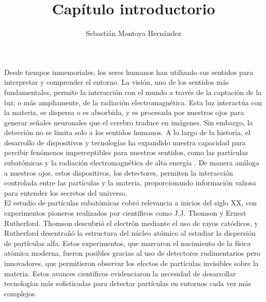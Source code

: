 \documentclass{article}
\title{\textbf{Capítulo introductorio}}
\author{Sebastián Montoya Hernández}
\begin{document}
\maketitle 
\setcounter{section}{0}

\noindent Desde tiempos inmemoriales, los seres humanos han utilizado sus sentidos para interpretar y comprender el entorno. La visión, uno de los sentidos más fundamentales, permite la interacción con el mundo a través de la captación de la luz, o más ampliamente, de la radiación electromagnética. Esta luz interactúa con la materia, se dispersa o es absorbida, y es procesada por nuestros ojos para generar señales neuronales que el cerebro traduce en imágenes. Sin embargo, la detección no se limita solo a los sentidos humanos. A lo largo de la historia, el desarrollo de dispositivos y tecnologías ha expandido nuestra capacidad para percibir fenómenos imperceptibles para nuestros sentidos, como las partículas subatómicas y la radiación electromagnética de alta energía \cite{swets1960signal}. De manera análoga a nuestros ojos, estos dispositivos, los detectores, permiten la interacción controlada entre las partículas y la materia, proporcionando información valiosa para entender los secretos del universo.\\

\noindent El estudio de partículas subatómicas cobró relevancia a inicios del siglo XX, con experimentos pioneros realizados por científicos como J.J. Thomson \cite{smith2001jj} y Ernest Rutherford\cite{rutherford1920bakerian}. Thomson descubrió el electrón mediante el uso de rayos catódicos, y Rutherford desentrañó la estructura del núcleo atómico al estudiar la dispersión de partículas alfa. Estos experimentos, que marcaron el nacimiento de la física atómica moderna, fueron posibles gracias al uso de detectores rudimentarios pero innovadores, que permitieron observar los efectos de partículas invisibles sobre la materia. Estos avances científicos evidenciaron la necesidad de desarrollar tecnologías más sofisticadas para detectar partículas en entornos cada vez más complejos.\\
\end{document}
